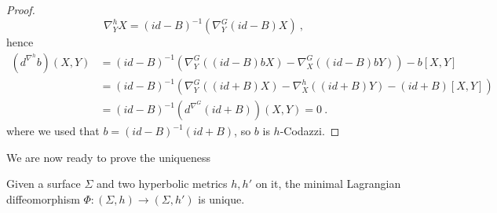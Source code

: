 \begin{proof}
    \[
        \nabla^h_Y X= (id-B)^{-1} (\nabla^G_Y (id-B)X) \ ,
    \]
    hence
    \[
    \begin{split}
        (d^{\nabla^h} b)(X,Y) & = (id - B)^{-1} (\nabla^G_Y ((id-B) b X) - \nabla^G_X ((id-B) b Y) ) - b \left[ X,Y \right] \\
        & = (id -B)^{-1} (\nabla^G_Y ((id+B) X) -  \nabla^h_X ((id+B) Y) - (id+B) \left[ X,Y \right] ) \\
        & = (id - B)^{-1}(d^{\nabla^G}(id+B))(X,Y) = 0 \ .
    \end{split}
    \]
    where we used that $b = (id - B)^{-1}(id + B)$, so $b$ is $h$-Codazzi.
\end{proof}

We are now ready to prove the uniqueness
\begin{theorem}
    Given a surface $\Sigma$ and two hyperbolic metrics $h, h'$ on it, the minimal Lagrangian diffeomorphism $\Phi : (\Sigma, h) \to (\Sigma, h')$ is unique.
\end{theorem}
